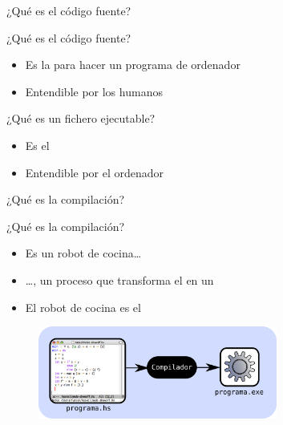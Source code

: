 \documentclass{beamer}
\begin{document}
\begin{frame}{¿Qué es el código fuente?}

  \begin{block}{¿Qué es el código fuente?}
    \begin{itemize}
    \item Es la  para hacer un programa de ordenador
    \item Entendible por los humanos 
    \end{itemize}
  \end{block}

  \begin{block}{¿Qué es un fichero ejecutable?}
    \begin{itemize}
    \item Es el 
    \item Entendible por el ordenador
    \end{itemize}
  \end{block}
\end{frame}


\begin{frame}{¿Qué es la compilación?}

  \begin{block}{¿Qué es la compilación?}
    \begin{itemize}
    \item Es un robot de cocina\ldots
    \item \ldots, un proceso que transforma el  en un       
    \item El robot de cocina es el 
    \end{itemize}
  \end{block}

  \begin{figure}
    \centering
    \includegraphics[width=0.7\textwidth]{pics/compilacion.png}
  \end{figure}

\end{frame}

\end{document}
